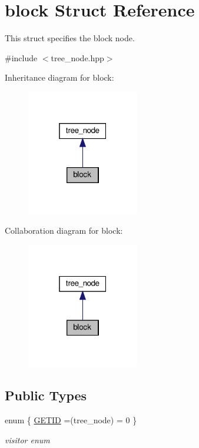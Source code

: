 \hypertarget{structblock}{}\section{block Struct Reference}
\label{structblock}


This struct specifies the block node.  




{\ttfamily \#include $<$tree\+\_\+node.\+hpp$>$}



Inheritance diagram for block\+:
\nopagebreak
\begin{figure}[H]
\begin{center}
\leavevmode
\includegraphics[width=139pt]{dd/dbf/structblock__inherit__graph}
\end{center}
\end{figure}


Collaboration diagram for block\+:
\nopagebreak
\begin{figure}[H]
\begin{center}
\leavevmode
\includegraphics[width=139pt]{df/dd9/structblock__coll__graph}
\end{center}
\end{figure}
\subsection*{Public Types}
\begin{DoxyCompactItemize}
\item 
enum \{ \hyperlink{structblock_ae1ef495b1cde98b628a2ce9d9f9e9d8ea51786bdb1e36f744d633f4881014fa9a}{G\+E\+T\+ID} =(tree\+\_\+node) = 0
 \}\begin{DoxyCompactList}\small\item\em visitor enum \end{DoxyCompactList}
\end{DoxyCompactItemize}
